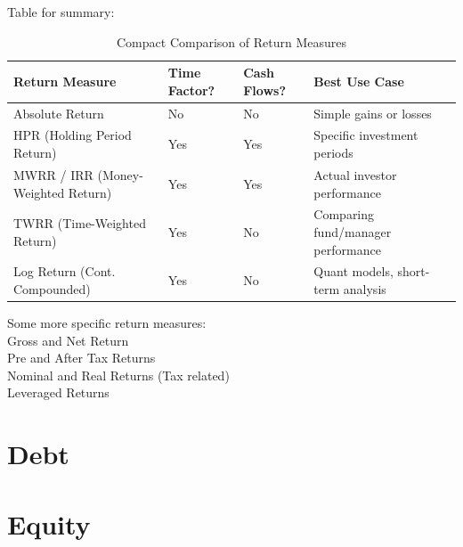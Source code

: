 \documentclass[a4paper]{article}
\begin{document}
Table for summary: 
\begin{table}[ht]
\small
\centering
\begin{tabular}{@{\hskip 2pt}l@{\hskip 2pt} l@{\hskip 2pt} l@{\hskip 2pt} p{5cm}@{\hskip 2pt}}
\toprule
\textbf{Return Measure} & \textbf{Time Factor?} & \textbf{Cash Flows?} & \textbf{Best Use Case} \\
\midrule
Absolute Return & No  & No  & Simple gains or losses \\
HPR (Holding Period Return) & Yes & Yes & Specific investment periods \\
MWRR / IRR (Money-Weighted Return) & Yes & Yes & Actual investor performance \\
TWRR (Time-Weighted Return) & Yes & No & Comparing fund/manager performance \\
Log Return (Cont. Compounded) & Yes & No & Quant models, short-term analysis \\
\bottomrule
\end{tabular}
\caption{Compact Comparison of Return Measures}
\label{tab:compact_returns}
\end{table}

Some more specific return measures:\\
Gross and Net Return\\
Pre and After Tax Returns\\
Nominal and Real Returns (Tax related)\\
Leveraged Returns

\pagebreak
\section{Debt}

\pagebreak
\section{Equity}
\end{document}
